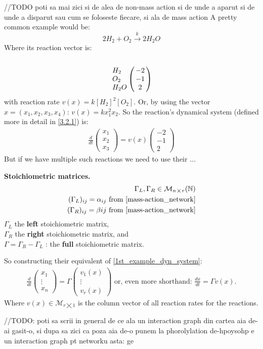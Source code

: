 \hfill\break
//TODO poti sa mai zici si de alea de non-mass action si de unde a aparut si de unde a disparut sau cum se foloseste fiecare, si ala de mass action
\hfill\break
A pretty common example would be:
\[
	2H_2 + O_2 \xrightarrow{k} 2H_2O
\]
Where its reaction vector is:
\[
	\bordermatrix{\cr \cr
		H_2 & -2 \cr
		O_2 & -1 \cr
		H_2O & 2 \cr
	}
\]
with reaction rate $v(x) = k[H_2]^2[O_2]$. Or, by using the vector $x=(x_1, x_2, x_3, x_4)$: $v(x) = k x_1^2 x_2$.
So the reaction's dynamical system (defined more in detail in \ref{3.2.1}) is:
\begin{align}\label{1st_example_dyn_system}
	\frac{d}{dt}
	\begin{pmatrix*}
		x_1 \\
		x_2 \\
		x_3
	\end{pmatrix*} =
	v(x)
	\begin{pmatrix}
		-2 \\
		-1 \\
		2
	\end{pmatrix}
\end{align}
But if we have multiple such reactions we need to use their $\ldots$
\begin{definition}
	\textbf{Stoichiometric matrices.}
	\begin{align*}
		\Gamma_L, \Gamma_R \in \mathcal{M}_{n \bigtimes r}(\mathbb{N}) \\
		(\Gamma_L)_{ij} = \alpha_{ij} \text{ from \ref{mass-action_network}} \\
		(\Gamma_R)_{ij} = \beta{ij} \text{ from \ref{mass-action_network}}
	\end{align*}
	$\Gamma_L$ the \textbf{left} stoichiometric matrix, \\
	$\Gamma_R$ the \textbf{right} stoichiometric matrix, and \\
	$\Gamma = \Gamma_R - \Gamma_L$ : the \textbf{full} stoichiometric matrix.
\end{definition}
So constructing their equivalent of \ref{1st_example_dyn_system}:
\begin{align}
	\frac{d}{dt}
	\begin{pmatrix*}
		x_1 \\
		\vdots \\
		x_n
	\end{pmatrix*} = \Gamma
	\begin{pmatrix*}
		v_1(x)	 \\
		\vdots \\
		v_r(x)
	\end{pmatrix*}
	\text{ or, even more shorthand:  }
	\frac{dx}{dt} = \Gamma v(x).
\end{align}
Where $v(x) \in \mathcal{M}_{r \bigtimes 1}$ is the column vector of all reaction rates for the reactions.

\hfill\break
//TODO: poti sa scrii in general de ce ala un interaction graph din cartea aia de-ai gasit-o, si dupa sa zici ca poza aia de-o punem la phorolylation de-hpoysohp e un interaction graph pt networku asta: ge
\hfill\break